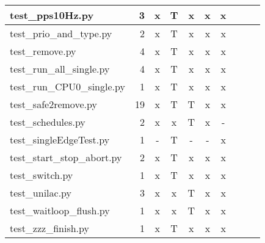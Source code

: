\documentclass[12pt,a4paper]{report}
\begin{document}
\begin{table}
\begin{tabular}[t]{|l|r|c|c|c|c|c|c|c|c|}
test\_pps10Hz.py                                &  3                  &   x        &   T             &   x           &   x              &   x                 \\ \hline
test\_prio\_and\_type.py                        &  2                  &   x        &   T             &   x           &   x              &   x                 \\ \hline
 test\_remove.py                       &  4                  &   x        &   T             &   x           &   x              &   x                 \\ \hline
test\_run\_all\_single.py                       &  4                  &   x        &   T             &   x           &   x              &   x                 \\ \hline
test\_run\_CPU0\_single.py                      &  1                  &   x        &   T             &   x           &   x              &   x                 \\ \hline
test\_safe2remove.py                            &  19                 &   x        &   T             &   T           &   x              &   x                 \\ \hline
test\_schedules.py                              &  2                  &   x        &   x             &   T           &   x              &   -                 \\ \hline
test\_singleEdgeTest.py                         &  1                  &   -        &   T             &   -           &   -              &   x                 \\ \hline
test\_start\_stop\_abort.py                     &  2                  &   x        &   T             &   x           &   x              &   x                 \\ \hline
test\_switch.py                                 &  1                  &   x        &   T             &   x           &   x              &   x                 \\ \hline
test\_unilac.py                                 &  3                  &   x        &   x             &   T           &   x              &   x                 \\ \hline
test\_waitloop\_flush.py                        &  1                  &   x        &   x             &   T           &   x              &   x                 \\ \hline
test\_zzz\_finish.py                            &  1                  &   x        &   T             &   x           &   x              &   x                 \\ \hline
\end{tabular}
\end{table}
\end{document}
